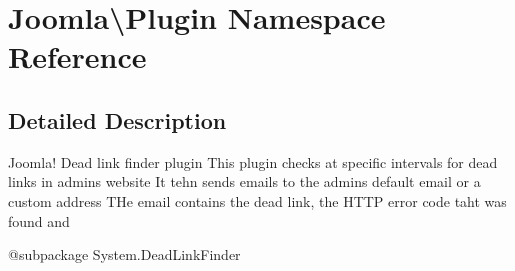 \hypertarget{namespace_joomla_1_1_plugin}{}\section{Joomla\textbackslash{}Plugin Namespace Reference}
\label{namespace_joomla_1_1_plugin}


\subsection{Detailed Description}
Joomla! Dead link finder plugin This plugin checks at specific intervals for dead links in admins website It tehn sends emails to the admins default email or a custom address T\+He email contains the dead link, the H\+T\+TP error code taht was found and

@subpackage System.\+Dead\+Link\+Finder 